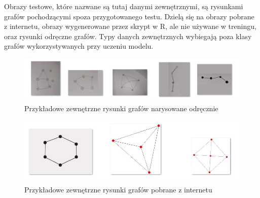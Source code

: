 Obrazy testowe, które nazwane są tutaj danymi zewnętrznymi, są rysunkami grafów pochodzącymi spoza przygotowanego testu.
Dzielą się na obrazy pobrane z internetu, obrazy wygenerowane przez skrypt w R, ale nie używane w treningu,
oraz rysunki odręczne grafów. Typy danych zewnętrznych wybiegają poza klasy grafów wykorzystywanych przy uczeniu modelu.

\begin{figure}[ht]
	\centering
	\includegraphics[width=15.5cm]{resources/tests/images/ext-graphs-drawn.png}
	\caption{Przykładowe zewnętrzne rysunki grafów narysowane odręcznie}
	\label{Fig:tests-outside-1}
\end{figure}
\FloatBarrier

\begin{figure}[ht]
	\centering
	\includegraphics[width=15cm]{resources/tests/images/ext-graphs-internet.png}
	\caption{Przykładowe zewnętrzne rysunki grafów pobrane z internetu}
	\label{Fig:tests-outside-2}
\end{figure}
\FloatBarrier